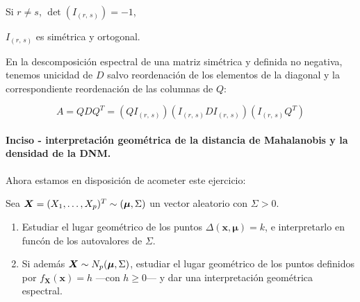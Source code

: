 \begin{nprop}[Propiedades] \hfill
  \begin{nlist}
  \item Si $r\ne s$, $\det(I_{(r,\,s)}) = -1$,
  \item $I_{(r,\,s)}$ es simétrica y ortogonal.
  \end{nlist}
\end{nprop}

En la descomposición espectral de una matriz simétrica y definida no negativa, tenemos unicidad de $D$
salvo reordenación de los elementos de la diagonal y la correspondiente reordenación de las columnas de $Q$:

\[
  A = QDQ^T = (QI_{(r,\,s)})(I_{(r,\,s)}DI_{(r,\,s)})(I_{(r,\,s)}Q^T)
\]


\paragraph{Inciso - interpretación geométrica de la distancia de Mahalanobis y la densidad de la DNM.}\hfill

Ahora estamos en disposición de acometer este ejercicio:

\begin{ejer}
  Sea $\boldsymbol{X} = (X_1, \dots, X_p)^T \sim (\boldsymbol \mu, \Sigma)$ un vector aleatorio con $\Sigma > 0$. \begin{enumerate}
    \item Estudiar el lugar geométrico de los puntos $\Delta(\boldsymbol x, \boldsymbol \mu) = k$, e interpretarlo en funcón de los autovalores de $\Sigma$.
    \item Si además $\boldsymbol{X} \sim N_p(\boldsymbol \mu, \Sigma)$, estudiar el lugar geométrico de los puntos definidos por $f_{\boldsymbol X}(\boldsymbol x) = h$ —con $h \geq 0$— y dar una interpretación geométrica espectral.
  \end{enumerate}
\end{ejer}

